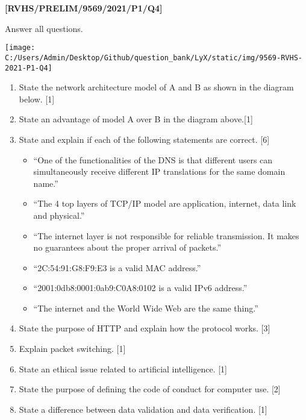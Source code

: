 \item \textbf{{[}RVHS/PRELIM/9569/2021/P1/Q4{]} }

Answer all questions. 
\begin{center}
\texttt{[image: C:/Users/Admin/Desktop/Github/question\_bank/LyX/static/img/9569-RVHS-2021-P1-Q4]}
\par\end{center}
\begin{enumerate}
\item State the network architecture model of A and B as shown in the diagram
below.\hfill{} {[}1{]}
\item State an advantage of model A over B in the diagram above.\hfill{}{[}1{]}
\item State and explain if each of the following statements are correct.
\hfill{}{[}6{]}
\begin{itemize}
\item \textquotedblleft One of the functionalities of the DNS is that different
users can simultaneously receive different IP translations for the
same domain name.\textquotedblright{} 
\item \textquotedblleft The 4 top layers of TCP/IP model are application,
internet, data link and physical.\textquotedblright{} 
\item \textquotedblleft The internet layer is not responsible for reliable
transmission. It makes no guarantees about the proper arrival of packets.\textquotedblright{} 
\item \textquotedblleft 2C:54:91:G8:F9:E3 is a valid MAC address.\textquotedblright{} 
\item \textquotedblleft 2001:0db8:0001:0ab9:C0A8:0102 is a valid IPv6 address.\textquotedblright{} 
\item \textquotedblleft The internet and the World Wide Web are the same
thing.\textquotedblright{} 
\end{itemize}
\item State the purpose of HTTP and explain how the protocol works. \hfill{}{[}3{]}
\item Explain packet switching. \hfill{}{[}1{]}
\item State an ethical issue related to artificial intelligence.\hfill{}
{[}1{]}
\item State the purpose of defining the code of conduct for computer use.
\hfill{}{[}2{]}
\item State a difference between data validation and data verification.\hfill{}
{[}1{]}
\end{enumerate}